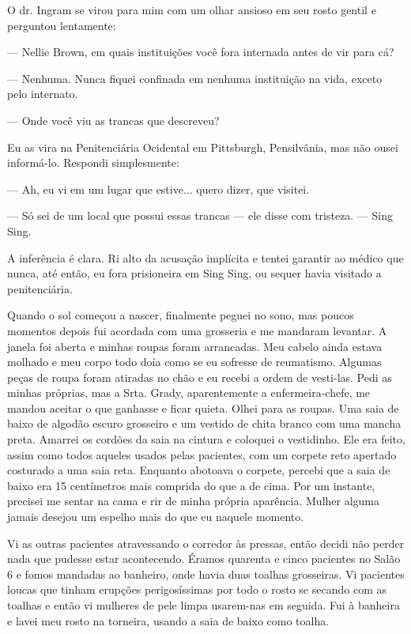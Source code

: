 O dr. Ingram se virou para mim com um olhar ansioso em seu rosto gentil
e perguntou lentamente:

--- Nellie Brown, em quais instituições você fora internada antes de vir
para cá?

--- Nenhuma. Nunca fiquei confinada em nenhuma instituição na vida,
exceto pelo internato.

--- Onde você viu as trancas que descreveu?

Eu as vira na Penitenciária Ocidental em Pittsburgh, Pensilvânia, mas
não ousei informá-lo. Respondi simplesmente:

--- Ah, eu vi em um lugar que estive... quero dizer, que visitei.

--- Só sei de um local que possui essas trancas --- ele disse com
tristeza. --- Sing Sing.

A inferência é clara. Ri alto da acusação implícita e tentei garantir ao
médico que nunca, até então, eu fora prisioneira em Sing Sing, ou sequer
havia visitado a penitenciária.

Quando o sol começou a nascer, finalmente peguei no sono, mas poucos
momentos depois fui acordada com uma grosseria e me mandaram levantar. A
janela foi aberta e minhas roupas foram arrancadas. Meu cabelo ainda
estava molhado e meu corpo todo doía como se eu sofresse de reumatismo.
Algumas peças de roupa foram atiradas no chão e eu recebi a ordem de
vesti-las. Pedi as minhas próprias, mas a Srta. Grady, aparentemente a
enfermeira-chefe, me mandou aceitar o que ganhasse e ficar quieta. Olhei
para as roupas. Uma saia de baixo de algodão escuro grosseiro e um
vestido de chita branco com uma mancha preta. Amarrei os cordões da saia
na cintura e coloquei o vestidinho. Ele era feito, assim como todos
aqueles usados pelas pacientes, com um corpete reto apertado costurado a
uma saia reta. Enquanto abotoava o corpete, percebi que a saia de baixo
era 15 centímetros mais comprida do que a de cima. Por um instante,
precisei me sentar na cama e rir de minha própria aparência. Mulher
alguma jamais desejou um espelho mais do que eu naquele momento.

Vi as outras pacientes atravessando o corredor às pressas, então decidi
não perder nada que pudesse estar acontecendo. Éramos quarenta e cinco
pacientes no Salão 6 e fomos mandadas ao banheiro, onde havia duas
toalhas grosseiras. Vi pacientes loucas que tinham erupções
perigosíssimas por todo o rosto se secando com as toalhas e então vi
mulheres de pele limpa usarem-nas em seguida. Fui à banheira e lavei meu
rosto na torneira, usando a saia de baixo como toalha.


